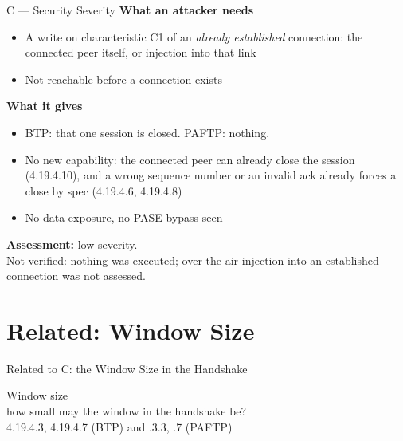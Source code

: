 \documentclass[10pt,aspectratio=169,t]{beamer}
\begin{document}
\begin{frame}{C --- Security Severity}
\textbf{What an attacker needs}
\begin{itemize}\small
  \item A write on characteristic C1 of an \emph{already established}
        connection: the connected peer itself, or injection into that link
  \item Not reachable before a connection exists
\end{itemize}
\textbf{What it gives}
\begin{itemize}\small
  \item BTP: that one session is closed. PAFTP: nothing.
  \item No new capability: the connected peer can already close the session
        (4.19.4.10), and a wrong sequence number or an invalid ack already
        forces a close by spec (4.19.4.6, 4.19.4.8)
  \item No data exposure, no PASE bypass seen
\end{itemize}
\textbf{Assessment:} low severity.\\[2pt]
\small Not verified: nothing was executed; over-the-air injection into an
established connection was not assessed.
\end{frame}

\section{Related: Window Size}

\begin{frame}{Related to C: the Window Size in the Handshake}
\begin{center}
\Large Window size\\[4pt]
\normalsize how small may the window in the handshake be?\\[4pt]
\small 4.19.4.3, 4.19.4.7 (BTP) \quad and .3.3, .7 (PAFTP)
\end{center}
\end{frame}
\end{document}
